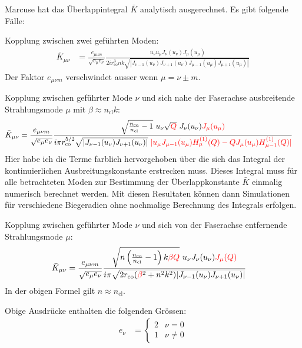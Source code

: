 \documentclass{article}
\def\({\left(}
\def\){\right)}
\newcommand{\nco}{n_\textrm{co}}
\newcommand{\rco}{r_\textrm{co}}
\newcommand{\ncl}{n_\textrm{cl}}
\begin{document}
Marcuse hat das \"Uberlappintegral $\bar K$ analytisch
ausgerechnet. Es gibt folgende F\"alle:



Kopplung zwischen zwei gef\"uhrten Moden:
\begin{align}
  \bar K_{\mu \nu} &= \frac{e_{\mu\nu m}}{\sqrt{e_\mu e_\nu}}
  \frac{u_\nu u_\mu J_\nu(u_\nu) J_\mu(u_\mu)}
       {2 i \rco^3 n k \sqrt{
           |J_{\nu-1}(u_\nu)J_{\nu+1}(u_\nu)
           J_{\mu-1}(u_\mu)J_{\mu+1}(u_\mu)|}}
\end{align}
Der Faktor $e_{\mu\nu m}$ verschwindet ausser wenn $\mu=\nu\pm m$.

Kopplung zwischen gef\"uhrter Mode $\nu$ und sich nahe der Faserachse
ausbreitende Strahlungsmode $\mu$ mit $\beta\approx \ncl k$:
\begin{align}
  \bar K_{\mu \nu} &= \frac{e_{\mu\nu m}}{\sqrt{e_\mu e_\nu}}
  \frac{\sqrt{\frac{\nco}{\ncl}-1}\ u_\nu\sqrt{\color{red}Q}\  J_\nu(u_\nu) {\color{red}J_\mu(u_\mu)}}
       {i \pi \rco^{5/2} \sqrt{|J_{\nu-1}(u_\nu)J_{\nu+1}(u_\nu)|}\ 
         {\color{red}|u_\mu J_{\mu-1}(u_\mu)H_{\mu}^{(1)}(Q)-QJ_\mu(u_\mu)H_{\mu-1}^{(1)}(Q)|}}
\end{align}
Hier habe ich die Terme farblich hervorgehoben \"uber die sich das
Integral der kontinuierlichen Ausbreitungskonstante erstrecken
muss. Dieses Integral muss f\"ur alle betrachteten Moden zur
Bestimmung der \"Uberlappkonstante $\bar K$ einmalig numerisch
berechnet werden. Mit diesen Resultaten k\"onnen dann Simulationen
f\"ur verschiedene Biegeradien ohne nochmalige Berechnung des
Integrals erfolgen.

Kopplung zwischen gef\"uhrter Mode $\nu$ und sich von der Faserachse
entfernende Strahlungsmode $\mu$:
\begin{align}
  \bar K_{\mu \nu} &= \frac{e_{\mu\nu m}}{\sqrt{e_\mu e_\nu}}
  \frac{\sqrt{n\(\frac{\nco}{\ncl}-1\)k\color{red}{\beta Q}}\ u_\nu  J_\nu(u_\nu) \color{red}{J_\mu(Q)}}
       {i \pi \sqrt{2 \rco ({\color{red}\beta}^2+n^2k^2)|J_{\nu-1}(u_\nu)J_{\nu+1}(u_\nu)|}}
\end{align}
In der obigen Formel gilt $n\approx\ncl$.

Obige Ausdr\"ucke enthalten die folgenden Gr\"ossen:
\begin{align}
  e_\nu &= \begin{cases} 2 & \nu=0 \\ 1 & \nu\not=0 \end{cases}
\end{align}
\end{document}
